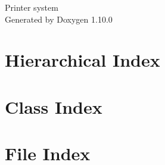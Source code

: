 \documentclass[twoside]{book}
\newcommand{\+}{\discretionary{\mbox{\scriptsize$\hookleftarrow$}}{}{}}
\newcommand{\clearemptydoublepage}{%
    \newpage{\pagestyle{empty}\cleardoublepage}%
  }
\begin{document}
  \raggedbottom
    \hypersetup{pageanchor=false,
                bookmarksnumbered=true,
                pdfencoding=unicode
               }
  \begin{titlepage}
  \vspace*{7cm}
  \begin{center}%
  {\Large Printer system}\\
  \vspace*{1cm}
  {\large Generated by Doxygen 1.10.0}\\
  \end{center}
  \end{titlepage}
  \clearemptydoublepage
  \tableofcontents
  \clearemptydoublepage
  \hypersetup{pageanchor=true}


\chapter{Hierarchical Index}

\chapter{Class Index}

\chapter{File Index}

\end{document}
